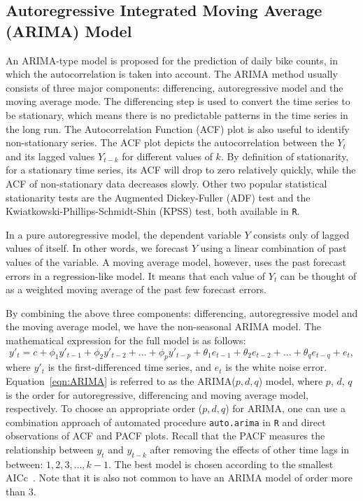 \documentclass [11pt, proquest] {uwthesis}[2015/03/03]
\begin{document}
\subsection{Autoregressive Integrated Moving Average (ARIMA) Model}
\label{arimaintro}

An ARIMA-type model is proposed for the prediction of daily bike counts, in which the autocorrelation is taken into account. The ARIMA method usually consists of three major components: differencing, autoregressive model and the moving average mode. The differencing step is used to convert the time series to be stationary, which means there is no predictable patterns in the time series in the long run. The Autocorrelation Function (ACF) plot is also useful to identify non-stationary series. The ACF plot depicts the autocorrelation between the $Y_t$ and its lagged values $Y_{t-k}$ for different values of $k$. By definition of stationarity, for a stationary time series, its ACF will drop to zero relatively quickly, while the ACF of non-stationary data decreases slowly. Other two popular statistical stationarity tests are the Augmented Dickey-Fuller (ADF) test and the Kwiatkowski-Phillips-Schmidt-Shin (KPSS) test, both available in \texttt{R}.

In a pure autoregressive model, the dependent variable $Y$ consists only of lagged values of itself. In other words, we forecast $Y$ using a linear combination of past values of the variable. A moving average model, however, uses the past forecast errors in a regression-like model. It means that each value of $Y_t$ can be thought of as a weighted moving average of the past few forecast errors. 

By combining the above three components: differencing, autoregressive model and the moving average model, we have the non-seasonal ARIMA model. The mathematical expression for the full model is as follows:
\begin{equation}
y'_t = c + \phi_1 y'_{t-1} + \phi_2 y'_{t-2} + \hdots + \phi_p y'_{t-p} + \theta_1 e_{t-1} + \theta_2 e_{t-2} + \hdots + \theta_q e_{t-q} + e_t, \label{eqn:ARIMA}
\end{equation}
where $y'_t$ is the first-differenced time series, and $e_t$ is the white noise error. Equation~\eqref{eqn:ARIMA} is referred to as the ARIMA($p,d,q$) model, where $p$, $d$, $q$ is the order for autoregressive, differencing and moving average model, respectively. To choose an appropriate order ($p,d,q$) for ARIMA, one can use a combination approach of automated procedure \texttt{auto.arima} in \texttt{R} and direct observations of ACF and PACF plots. Recall that the PACF measures the relationship between $y_t$ and $y_{t-k}$ after removing the effects of other time lags in between: $1, 2, 3, \hdots, k-1$. The best model is chosen according to the smallest AICc~\cite{Rob2013}. Note that it is also not common to have an ARIMA model of order more than 3.
\end{document}
